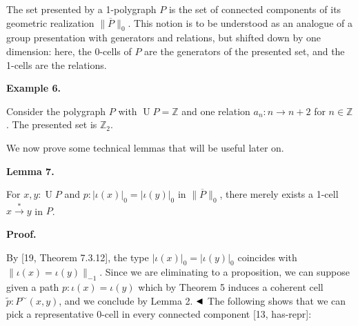 \documentclass[10pt,a4paper]{amsart}
\begin{document}
 
The set presented by a 1-polygraph $P$ is the set of connected components of its geometric realization $\|\overline{P}\|_{0}$. This notion is to be understood as an analogue of a group presentation with generators and relations, but shifted down by one dimension: here, the 0-cells of $P$ are the generators of the presented set, and the 1-cells are the relations.\par
 
 
 
\par\medskip\noindent\textbf{Example 6.}\par
 
 
Consider the polygraph $P$ with $\operatorname{U}P=\mathbb{Z}$ and one relation $a_{n}:n\to n+2$ for $n\in\mathbb{Z}$. The presented set is $\mathbb{Z}_{2}$.\par
 
 
 
 
We now prove some technical lemmas that will be useful later on.\par
 
 
 
\par\medskip\noindent\textbf{Lemma 7.}\par
 
 
For $x,y:\operatorname{U}P$ and $p:|\iota(x)|_{0}=|\iota(y)|_{0}$ in $\|\overline{P}\|_{0}$, there merely exists a 1-cell $x\overset{*}{\to}y$ in $P$.\par
 
 
 
 
 
\par\medskip\noindent\textbf{Proof.}\par
 
 
By [19, Theorem 7.3.12], the type $|\iota(x)|_{0}=|\iota(y)|_{0}$ coincides with $\|\iota(x)=\iota(y)\|_{-1}$. Since we are eliminating to a proposition, we can suppose given a path $p:\iota(x)=\iota(y)$ which by Theorem 5 induces a coherent cell $\tilde{p}:P^{\sim}(x,y)$, and we conclude by Lemma 2. $\hfill\blacktriangleleft$ The following shows that we can pick a representative 0-cell in every connected component [13, has-repr]:\par
 
\end{document}
